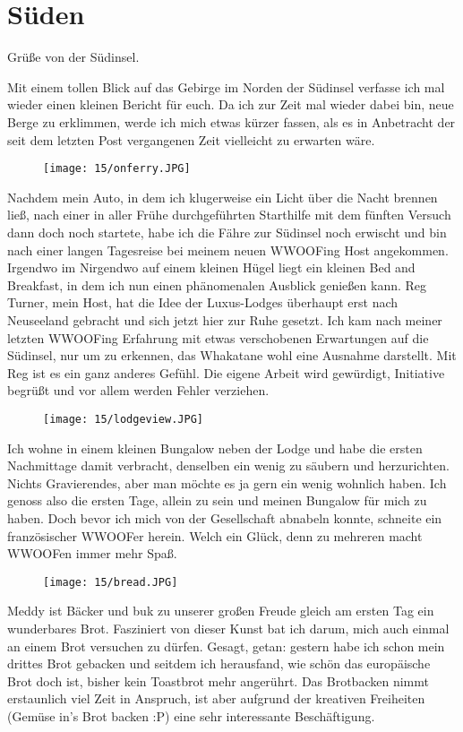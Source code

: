 \chapter{S\"uden}

Grüße von der Südinsel.

Mit einem tollen Blick auf das Gebirge im Norden der Südinsel verfasse
ich mal wieder einen kleinen Bericht für euch. Da ich zur Zeit mal
wieder dabei bin, neue Berge zu erklimmen, werde ich mich etwas kürzer
fassen, als es in Anbetracht der seit dem letzten Post vergangenen Zeit
vielleicht zu erwarten wäre.

\begin{figure}[h]
  \centering
  \texttt{[image: 15/onferry.JPG]}
\end{figure}
Nachdem mein Auto, in dem ich klugerweise ein Licht über die Nacht
brennen ließ, nach einer in aller Frühe durchgeführten Starthilfe mit
dem fünften Versuch dann doch noch startete, habe ich die Fähre zur
Südinsel noch erwischt und bin nach einer langen Tagesreise bei meinem
neuen WWOOFing Host angekommen. Irgendwo im Nirgendwo auf einem kleinen
Hügel liegt ein kleinen Bed and Breakfast, in dem ich nun einen
phänomenalen Ausblick genießen kann. Reg Turner, mein Host, hat die Idee
der Luxus-Lodges überhaupt erst nach Neuseeland gebracht und sich jetzt
hier zur Ruhe gesetzt. Ich kam nach meiner letzten WWOOFing Erfahrung
mit etwas verschobenen Erwartungen auf die Südinsel, nur um zu erkennen,
das Whakatane wohl eine Ausnahme darstellt. Mit Reg ist es ein ganz
anderes Gefühl. Die eigene Arbeit wird gewürdigt, Initiative begrüßt und
vor allem werden Fehler verziehen.
\begin{figure}[h]
  \centering
  \texttt{[image: 15/lodgeview.JPG]}
\end{figure}

Ich wohne in einem kleinen Bungalow neben der Lodge und habe die ersten
Nachmittage damit verbracht, denselben ein wenig zu säubern und
herzurichten. Nichts Gravierendes, aber man möchte es ja gern ein wenig
wohnlich haben. Ich genoss also die ersten Tage, allein zu sein und
meinen Bungalow für mich zu haben. Doch bevor ich mich von der
Gesellschaft abnabeln konnte, schneite ein französischer WWOOFer herein.
Welch ein Glück, denn zu mehreren macht WWOOFen immer mehr Spaß.

\begin{figure}[h]
  \centering
  \texttt{[image: 15/bread.JPG]}
\end{figure}
Meddy ist Bäcker und buk zu unserer großen Freude gleich am ersten Tag
ein wunderbares Brot. Fasziniert von dieser Kunst bat ich darum, mich
auch einmal an einem Brot versuchen zu dürfen. Gesagt, getan: gestern
habe ich schon mein drittes Brot gebacken und seitdem ich herausfand,
wie schön das europäische Brot doch ist, bisher kein Toastbrot mehr
angerührt. Das Brotbacken nimmt erstaunlich viel Zeit in Anspruch, ist
aber aufgrund der kreativen Freiheiten (Gemüse in's Brot backen :P)
eine sehr interessante Beschäftigung.

